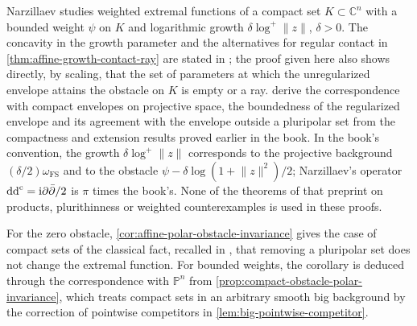 Narzillaev studies weighted extremal functions of a compact set $K\subset\mathbb C^n$ with a bounded weight $\psi$ on $K$ and logarithmic growth $\delta\log^+\lVert z\rVert$, $\delta>0$. The concavity in the growth parameter and the alternatives for regular contact in \cref{thm:affine-growth-contact-ray} are stated in \cite[v1, Lemma~3.1, p.~6, and Theorem~1.1, p.~2]{NarzillaevWeighted26}; the proof given here also shows directly, by scaling, that the set of parameters at which the unregularized envelope attains the obstacle on $K$ is empty or a ray.  derive the correspondence with compact envelopes on projective space, the boundedness of the regularized envelope and its agreement with the envelope outside a pluripolar set from the compactness and extension results proved earlier in the book. In the book's convention, the growth $\delta\log^+\lVert z\rVert$ corresponds to the projective background $(\delta/2)\omega_{\mathrm{FS}}$ and to the obstacle $\psi-\delta\log(1+\lVert z\rVert^2)/2$; Narzillaev's operator $\mathrm{dd}^{\mathrm{c}}=\mathrm i\partial\bar\partial/2$ is $\pi$ times the book's. None of the theorems of that preprint on products, plurithinness or weighted counterexamples is used in these proofs.

For the zero obstacle, \cref{cor:affine-polar-obstacle-invariance} gives the case of compact sets of the classical fact, recalled in \cite[v1, Section~2, equation~(4), p.~4]{NarzillaevWeighted26}, that removing a pluripolar set does not change the extremal function. For bounded weights, the corollary is deduced through the correspondence with $\mathbb P^n$ from \cref{prop:compact-obstacle-polar-invariance}, which treats compact sets in an arbitrary smooth big background by the correction of pointwise competitors in \cref{lem:big-pointwise-competitor}.

